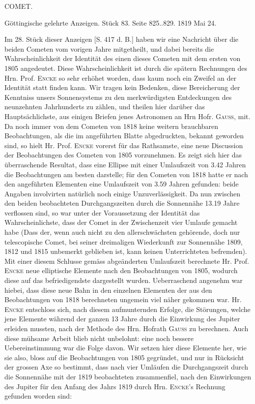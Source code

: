 \clearpage
{}
\begin{center}
\Large COMET.

\medskip
Göttingische gelehrte Anzeigen. Stück 83. Seite 825..829. 1819 Mai 24.
\end{center}

\par\indent Im 28. Stück dieser Anzeigen [S. 417 d. B.] haben wir eine Nachricht über die beiden
Cometen vom vorigen Jahre mitgetheilt, und dabei bereits die Wahrscheinlichkeit der
Identität des einen dieses Cometen mit dem ersten von 1805 angedeutet. Diese
Wahrscheinlichkeit ist durch die spätern Rechnungen des Hrn. Prof. \textsc{Encke} so sehr
erhöhet worden, dass kaum noch ein Zweifel an der Identität statt finden kann. Wir
tragen kein Bedenken, diese Bereicherung der Kenntniss unsers Sonnensystems zu den
merkwürdigsten Entdeckungen des neunzehnten Jahrhunderts zu zählen, und theilen hier
darüber das Hauptsächlichste, aus einigen Briefen jenes Astronomen an Hrn Hofr.
\textsc{Gauss}, mit. Da noch immer von dem Cometen von 1818 keine weitern brauchbaren
Beobachtungen, als die im angeführten Blatte
abgedruckten, bekannt geworden sind, so hielt Hr. Prof. \textsc{Encke} vorerst für das
Rathsamste, eine neue Discussion der Beobachtungen des Cometen von 1805 vorzunehmen.
Es zeigt sich hier das überraschende Resultat, dass eine Ellipse mit einer
Umlaufszeit von 3.42 Jahren die Beobachtungen am besten darstelle; für den Cometen
von 1818 hatte er nach den angeführten Elementen eine Umlaufszeit von 3.59 Jahren
gefunden: beide Angaben involvirten natürlich noch einige Unzuverlässigkeit. Da nun
zwischen den beiden beobachteten Durchgangszeiten durch die Sonnennähe 13.19 Jahre
verflossen sind, so war unter der Voraussetzung der Identität das Wahrscheinlichste,
dass der Comet in der Zwischenzeit vier Umlaufe gemacht habe (Dass der, wenn auch
nicht zu den allerschwächsten gehörende, doch nur telescopische Comet, bei seiner
dreimaligen Wiederkunft zur Sonnennähe 1809, 1812 und 1815 unbemerkt geblieben ist,
kann keinen Unterrichteten befremden). Mit einer diesem Schlusse gemäss abgeänderten
Umlaufszeit berechnete Hr. Prof. \textsc{Encke} neue elliptische Elemente nach den
Beobachtungen von 1805, wodurch diese auf das befriedigendste dargestellt wurden.
Ueberraschend angenehm war hiebei, dass diese neue Bahn in den einzelnen Elementen
der aus den Beobachtungen von 1818 berechneten ungemein viel näher gekommen war.
Hr. \textsc{Encke} entschloss sich, nach diesem aufmunternden Erfolge, die Störungen, welche
jene Elemente während der ganzen 13 Jahre durch die Einwirkung des Jupiter erleiden
mussten, nach der Methode des Hrn. Hofrath \textsc{Gauss} zu berechnen. Auch diese mühsame
Arbeit blieb nicht unbelohnt: eine noch bessere Uebereinstimmung war die Folge davon.
Wir setzen hier diese Elemente her, wie sie also, bloss auf die Beobachtungen von
1805 gegründet, und nur in Rücksicht der
grossen Axe so bestimmt, dass nach vier Umläufen die Durchgangszeit durch die
Sonnennähe mit der 1819 beobachteten zusammenfiel, nach den Einwirkungen des Jupiter
für den Anfang des Jahrs 1819 durch Hrn. \textsc{Encke}'s Rechnung gefunden worden sind:

